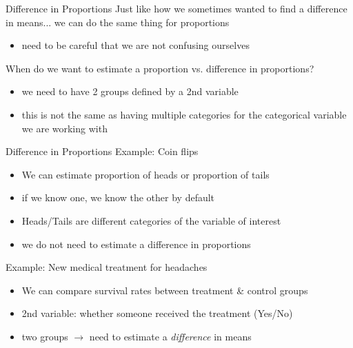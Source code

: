 \documentclass{beamer}
\begin{document}
\begin{frame}{Difference in Proportions}
Just like how we sometimes wanted to find a difference in means... we can do the same thing for proportions
\begin{itemize}
    \item need to be careful that we are not confusing ourselves
\end{itemize} \vspace{4mm}

When do we want to estimate a proportion vs. difference in proportions?
\begin{itemize}
    \item we need to have 2 groups defined by a 2nd variable
    \item this is not the same as having multiple categories for the categorical variable we are working with
\end{itemize} \vspace{4mm}
\end{frame}

\begin{frame}{Difference in Proportions}
Example: Coin flips
\begin{itemize}
    \item We can estimate proportion of heads or proportion of tails
    \item if we know one, we know the other by default
    \item Heads/Tails are different categories of the variable of interest
    \item we do not need to estimate a difference in proportions
\end{itemize} \vspace{8mm}

Example: New medical treatment for headaches
\begin{itemize}
    \item We can compare survival rates between treatment \& control groups
    \item 2nd variable: whether someone received the treatment (Yes/No)
    \item two groups $\rightarrow$ need to estimate a \textit{difference} in means
\end{itemize}
\end{frame}
\end{document}
